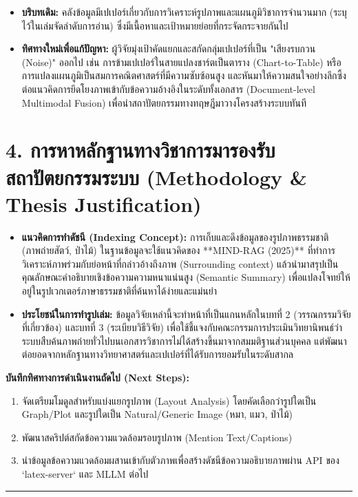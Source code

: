 \documentclass[10pt,a4paper]{article}
\begin{document}
\begin{itemize}
  \item \textbf{บริบทเดิม:} คลังข้อมูลมีเปเปอร์เกี่ยวกับการวิเคราะห์รูปภาพและแผนภูมิวิชาการจำนวนมาก (ระบุไว้ในเล่มจัดลำดับการอ่าน) ซึ่งมีเนื้อหาและเป้าหมายย่อยที่กระจัดกระจายกันไป
  \item \textbf{ทิศทางใหม่เพื่อแก้ปัญหา:} ผู้วิจัยมุ่งเป้าคัดแยกและสกัดกลุ่มเปเปอร์ที่เป็น "เสียงรบกวน (Noise)" ออกไป เช่น การข้ามเปเปอร์ในสายแปลงชาร์ตเป็นตาราง (Chart-to-Table) หรือการแปลงแผนภูมิเป็นสมการคณิตศาสตร์ที่มีความซับซ้อนสูง และหันมาให้ความสนใจอย่างลึกซึ้งต่อแนวคิดการยึดโยงภาพเข้ากับข้อความอ้างอิงในระดับทั้งเอกสาร (Document-level Multimodal Fusion) เพื่อนำสถาปัตยกรรมทางทฤษฎีมาวางโครงสร้างระบบทันที
\end{itemize}

\vspace{6pt}

\section*{4. การหาหลักฐานทางวิชาการมารองรับสถาปัตยกรรมระบบ (Methodology \& Thesis Justification)}

\begin{itemize}
  \item \textbf{แนวคิดการทำดัชนี (Indexing Concept):} การเก็บและดึงข้อมูลของรูปภาพธรรมชาติ (ภาพถ่ายสัตว์, ป่าไม้) ในฐานข้อมูลจะใช้แนวคิดของ **MIND-RAG (2025)** ที่ทำการวิเคราะห์ภาพร่วมกับย่อหน้าที่กล่าวอ้างถึงภาพ (Surrounding context) แล้วนำมาสรุปเป็นคุณลักษณะคำอธิบายเชิงข้อความความหนาแน่นสูง (Semantic Summary) เพื่อแปลงโจทย์ให้อยู่ในรูปเวกเตอร์ภาษาธรรมชาติที่ค้นหาได้ง่ายและแม่นยำ
  \item \textbf{ประโยชน์ในการทำรูปเล่ม:} ข้อมูลวิจัยเหล่านี้จะทำหน้าที่เป็นแกนหลักในบทที่ 2 (วรรณกรรมวิจัยที่เกี่ยวข้อง) และบทที่ 3 (ระเบียบวิธีวิจัย) เพื่อใช้ชี้แจงกับคณะกรรมการประเมินวิทยานิพนธ์ว่า ระบบสืบค้นภาพถ่ายทั่วไปบนเอกสารวิชาการไม่ได้สร้างขึ้นมาจากสมมติฐานส่วนบุคคล แต่พัฒนาต่อยอดจากหลักฐานทางวิทยาศาสตร์และเปเปอร์ที่ได้รับการยอมรับในระดับสากล
\end{itemize}

\vspace{12pt}

\begin{highlight}
  \textbf{บันทึกทิศทางการดำเนินงานถัดไป (Next Steps):}
  \begin{enumerate}[nosep, leftmargin=2em]
    \item จัดเตรียมโมดูลสำหรับแบ่งแยกรูปภาพ (Layout Analysis) โดยคัดเลือกว่ารูปใดเป็น Graph/Plot และรูปใดเป็น Natural/Generic Image (หมา, แมว, ป่าไม้)
    \item พัฒนาสคริปต์สกัดข้อความแวดล้อมรอบรูปภาพ (Mention Text/Captions)
    \item นำข้อมูลข้อความแวดล้อมผสานเข้ากับตัวภาพเพื่อสร้างดัชนีข้อความอธิบายภาพผ่าน API ของ `latex-server` และ MLLM ต่อไป
  \end{enumerate}
\end{highlight}

\vspace{16pt}
\noindent\rule{\textwidth}{1pt}
\end{document}
